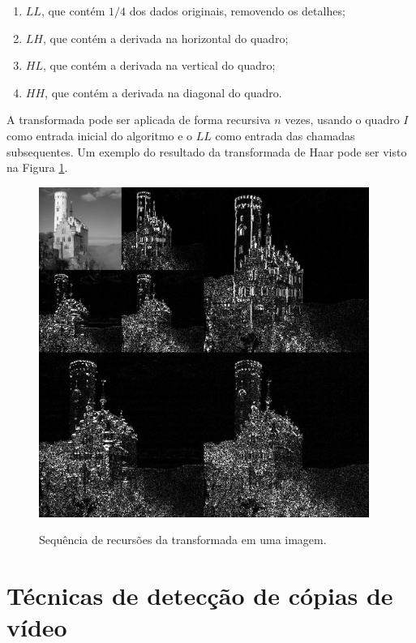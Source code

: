 \begin{enumerate}
\item $LL$, que contém $1/4$ dos dados originais, removendo os detalhes;
\item $LH$, que contém a derivada na horizontal do quadro;
\item $HL$, que contém a derivada na vertical do quadro;
\item $HH$, que contém a derivada na diagonal do quadro.
\end{enumerate}

A transformada pode ser aplicada de forma recursiva $n$ vezes, usando o quadro $I$ como entrada inicial do algoritmo e o $LL$ como entrada das chamadas subsequentes. Um exemplo do resultado da transformada de Haar pode ser visto na Figura \ref{fig:transf_haar}.

 \begin{figure}[h]
      \centering
      \caption{Sequência de recursões da transformada em uma imagem.}
      \includegraphics[width=0.96\textwidth]{dados/figuras/haar.png}      
      \label{fig:transf_haar}
    \end{figure}  

\section{Técnicas de detecção de cópias de vídeo} 
     
